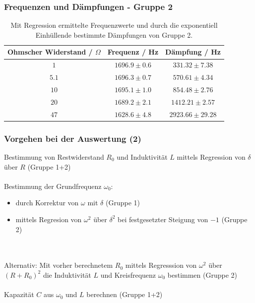 \documentclass{beamer}
\begin{document}
\begin{frame}
\frametitle{Frequenzen und Dämpfungen - Gruppe 2}
\begin{table}
\centering
\begin{tabular}{c|c|c}
Ohmscher Widerstand / $\Omega$ & Frequenz / Hz & Dämpfung / Hz \\
\hline
$1$ & $1696.9 \pm 0.6$ & $331.32\pm 7.38$ \\
$5.1$ & $1696.3 \pm 0.7$ & $570.61\pm 4.34$ \\
$10$ & $1695.1 \pm 1.0$ & $854.48\pm 2.76$ \\
$20$ & $1689.2 \pm 2.1$ & $1412.21\pm 2.57$  \\
$47$ & $1628.6 \pm 4.8$ & $2923.66\pm 29.28$
\end{tabular}
\caption{Mit Regression ermittelte Frequenzwerte und durch die exponentiell Einhüllende bestimmte Dämpfungen von Gruppe 2.}
\end{table}
\end{frame}


\begin{frame}
\frametitle{Vorgehen bei der Auswertung (2)}
Bestimmung von Restwiderstand $R_0$ und Induktivität $L$ mittels Regression von $\delta$ über $R$ (Gruppe 1+2) \\
\ \\
Bestimmung der Grundfrequenz $\omega_0$:
\begin{itemize}
\item durch Korrektur von $\omega$ mit $\delta$ (Gruppe 1)
\item mittels Regresion von $\omega^2$ über $\delta^2$ bei festgesetzter Steigung von $-1$ (Gruppe 2)
\end{itemize} 
\ \\
\ \\
Alternativ: Mit vorher berechnetem $R_0$ mittels Regresssion von $\omega^2$ über $(R+R_0)^2$ die Induktivität $L$ und Kreisfrequenz $\omega_0$ bestimmen (Gruppe 2) \\
\ \\
Kapazität $C$ aus $\omega_0$ und $L$ berechnen (Gruppe 1+2)

\end{frame}
\end{document}
